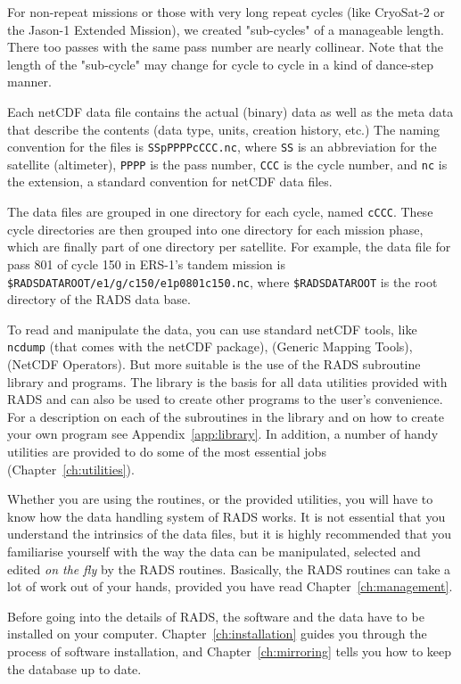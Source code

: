 \documentclass[a4paper,11pt,openany,natbib,nomargin]{thesis}
\begin{document}
For non-repeat missions or those with very long repeat cycles (like CryoSat-2 or the Jason-1 Extended Mission), we created "sub-cycles" of a manageable length. There too passes with the same pass number are nearly collinear. Note that the length of the "sub-cycle" may change for cycle to cycle in a kind of dance-step manner.

Each netCDF data file contains the actual (binary) data as well as the meta data that describe the contents (data type, units, creation history, etc.) The naming convention for the files is \verb|SSpPPPPcCCC.nc|, where \verb|SS| is an abbreviation for the satellite (altimeter), \verb|PPPP| is the pass number, \verb|CCC| is the cycle number, and \verb|nc| is the extension, a standard convention for netCDF data files.

The data files are grouped in one directory for each cycle, named \verb|cCCC|. These cycle directories are then grouped into one directory for each mission phase, which are finally part of one directory per satellite. For example, the data file for pass 801 of cycle 150 in ERS-1's tandem mission is \verb|$RADSDATAROOT/e1/g/c150/e1p0801c150.nc|, where \verb|$RADSDATAROOT| is the root directory of the RADS data base.

To read and manipulate the data, you can use standard netCDF tools, like \verb|ncdump| (that comes with the netCDF package),  (Generic Mapping Tools),  (NetCDF Operators). But more suitable is the use of the RADS subroutine library and programs. The library is the basis for all data utilities provided with RADS and can also be used to create other programs to the user's convenience. For a description on each of the subroutines in the library and on how to create your own program see Appendix~\ref{app:library}. In addition, a number of handy utilities are provided to do some of the most essential jobs (Chapter~\ref{ch:utilities}).

Whether you are using the routines, or the provided utilities, you will have to know how the data handling system of RADS works. It is not essential that you understand the intrinsics of the data files, but it is highly recommended that you familiarise yourself with the way the data can be manipulated, selected and edited \emph{on the fly} by the RADS routines. Basically, the RADS routines can take a lot of work out of your hands, provided you have read Chapter~\ref{ch:management}.

Before going into the details of RADS, the software and the data have to be installed on your computer. Chapter~\ref{ch:installation} guides you through the process of software installation, and Chapter~\ref{ch:mirroring} tells you how to keep the database up to date.
\end{document}
